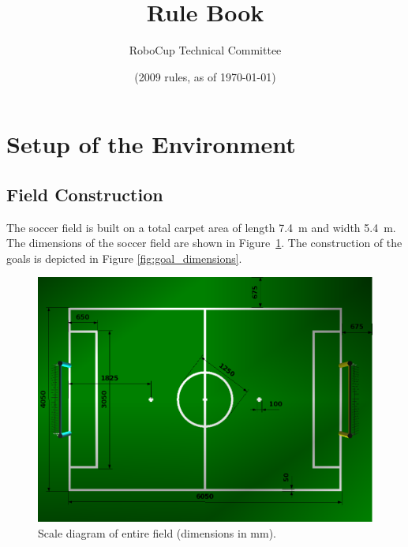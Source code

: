 \documentclass[12pt]{article}
\title{\leaguename Rule Book}
\author{RoboCup Technical Committee}
\date{(2009 rules, as of \today)}
\newcommand{\TotalWidth}{5.4~m\xspace}
\newcommand{\TotalLength}{7.4~m\xspace }
\begin{document}
\maketitle

\vfill

\tableofcontents
\setcounter{tocdepth}{3}

\thispagestyle{fancy}

\clearpage

\cfoot{\thepage}
\setcounter{page}{1}

\section{Setup of the Environment}

\subsection{Field Construction}

The soccer field is built on a total carpet area of length \TotalLength and width \TotalWidth. The dimensions of the soccer field are shown in Figure~\ref{fig:field_dim}. The construction of the goals is depicted in Figure \ref{fig:goal_dimensions}.

\begin{figure}[b!]
\centerline{\includegraphics[width=\columnwidth]{figs/fieldDimensions2009.png}}
\caption{Scale diagram of entire field (dimensions in mm).} \label{fig:field_dim}
\end{figure}
\end{document}
